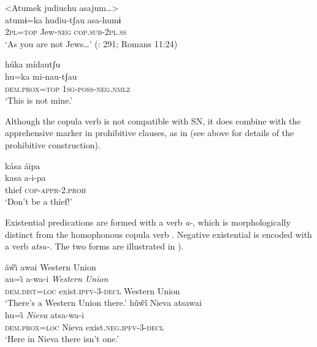 \documentclass[output=paper,colorlinks,citecolor=brown,draft]{langscibook}
\begin{document}
\ea\label{ex:agu:21}
     \glll <Atumek judiuchu asajum…> \\ 
           atumɨ=ka  hudiu-tʃau  asa-humɨ \\
           2\textsc{pl=top}  Jew-\textsc{neg}  \textsc{cop.sub-2pl.ss} \\
    \glt ‘As you are not Jews…’ (\citealt{LigaBíblica2008}: 291; Romans 11:24)
\z           

\ea\label{ex:agu:22}
    \glll húka mídautʃu \\ 
          hu=ka  mi-nau-tʃau \\
          \textsc{dem.prox=top}  \textsc{1sg-poss-neg.nmlz} \\
    \glt ‘This is not mine.’ \citep[406]{Overall2017a}
\z
          
Although the copula verb is not compatible with SN, it does combine with the apprehensive marker in prohibitive clauses, as in  (see  above for details of the prohibitive construction).

\ea\label{ex:agu:23}
    \glll kása áipa\\ 
          kasa  a-i-pa\\
          thief  \textsc{cop-appr-2.proh}\\
    \glt ‘Don’t be a thief!’ \citep[78]{Overall2017b}
\z           

Existential predications are formed with a verb \textit{a-}, which is morphologically distinct from the homophonous copula verb \citep{Overall2018,OverallForthcoming}. Negative existential is encoded with a verb \textit{atsu-}. The two forms are illustrated in ).

\ea\label{ex:agu:24}
    \ea\label{ex:agu:24a}
        \glll ã\~{w}\~\i{} awai {Western Union} \\ 
              au=\~\i{}  a-wa-i  \textit{Western Union} \\
              \textsc{dem.dist=loc} exist.\textsc{ipfv}{}-3-\textsc{decl}  {Western Union} \\
        \glt ‘There’s a {Western Union} there.’
    \ex\label{ex:agu:24b}
        \glll h\~u\~{w}\~{i}  Nieva atsawai \\
              hu=\~\i{} \textit{Nieva}  atsa-wa-i \\
              \textsc{dem.prox=loc}  Nieva  exist\textsc{.neg.ipfv-3-decl}\\
        \glt ‘Here in Nieva there isn’t one.’ \citep[158]{Overall2017a}
    \z
\z     
\end{document}
